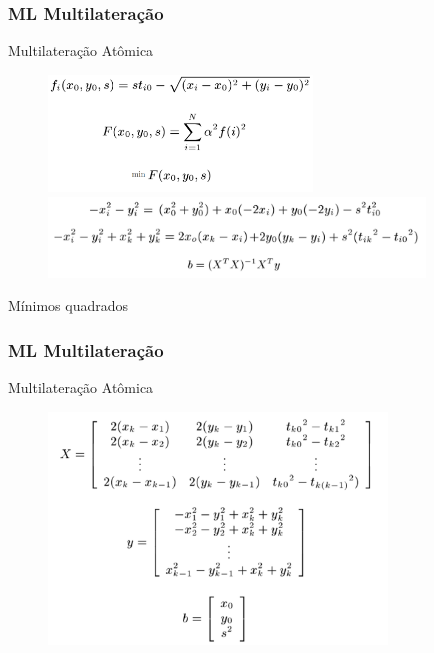 \documentclass{beamer}
\begin{document}
\begin{frame}
\frametitle{\normalsize ML Multilateração}
\begin{flushleft}
	Multilateração Atômica\\
	\begin{figure} 
		\hspace{0.5cm} \includegraphics[width=7.0cm]{atomicmleq} \\
	\vspace{0.2cm} \hspace{0.4cm} \includegraphics[width=10.0cm]{atomicmleq2}
	 \end{figure}
	\vspace{0.4cm}
\end{flushleft}
\begin{flushright}
	\vspace{-0.6cm}
	Mínimos quadrados
\end{flushright}
\end{frame}

\begin{frame}
\frametitle{\normalsize ML Multilateração}
\begin{flushleft}
	Multilateração Atômica\\
	\begin{figure} 
		\hspace{0.5cm} \includegraphics[width=9cm]{atomicmleq3} 
	\end{figure}
	\vspace{0.4cm}
\end{flushleft}
\end{frame}
\end{document}
